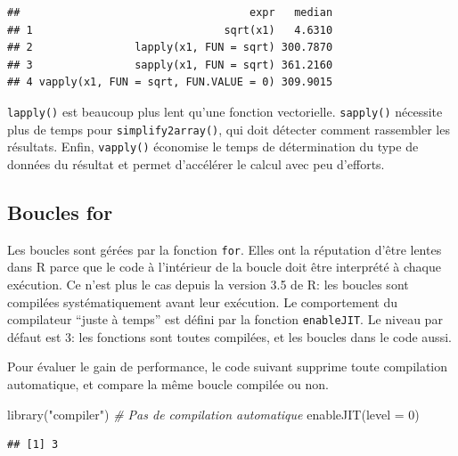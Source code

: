 \documentclass[
  11pt,
  french,
  a4paper,
  extrafontsizes,onecolumn,openright
  ]{memoir}
\newenvironment{Shaded}{\begin{snugshade}}{\end{snugshade}}
\newcommand{\AttributeTok}[1]{\textcolor[rgb]{0.77,0.63,0.00}{#1}}
\newcommand{\CommentTok}[1]{\textcolor[rgb]{0.56,0.35,0.01}{\textit{#1}}}
\newcommand{\DecValTok}[1]{\textcolor[rgb]{0.00,0.00,0.81}{#1}}
\newcommand{\FunctionTok}[1]{\textcolor[rgb]{0.00,0.00,0.00}{#1}}
\newcommand{\NormalTok}[1]{#1}
\newcommand{\StringTok}[1]{\textcolor[rgb]{0.31,0.60,0.02}{#1}}
\begin{document}
\begin{verbatim}
##                                    expr   median
## 1                              sqrt(x1)   4.6310
## 2                lapply(x1, FUN = sqrt) 300.7870
## 3                sapply(x1, FUN = sqrt) 361.2160
## 4 vapply(x1, FUN = sqrt, FUN.VALUE = 0) 309.9015
\end{verbatim}

\normalsize
\texttt{lapply()} est beaucoup plus lent qu'une fonction vectorielle.
\texttt{sapply()} nécessite plus de temps pour \texttt{simplify2array()}, qui doit détecter comment rassembler les résultats.
Enfin, \texttt{vapply()} économise le temps de détermination du type de données du résultat et permet d'accélérer le calcul avec peu d'efforts.

\hypertarget{boucles-for}{%
\subsection{Boucles for}\label{boucles-for}}

Les boucles sont gérées par la fonction \texttt{for}.
Elles ont la réputation d'être lentes dans R parce que le code à l'intérieur de la boucle doit être interprété à chaque exécution.
Ce n'est plus le cas depuis la version 3.5 de R: les boucles sont compilées systématiquement avant leur exécution.
Le comportement du compilateur ``juste à temps'' est défini par la fonction \texttt{enableJIT}.
Le niveau par défaut est 3: les fonctions sont toutes compilées, et les boucles dans le code aussi.

Pour évaluer le gain de performance, le code suivant supprime toute compilation automatique, et compare la même boucle compilée ou non.

\scriptsize

\begin{Shaded}
\begin{Highlighting}[]
\FunctionTok{library}\NormalTok{(}\StringTok{"compiler"}\NormalTok{)}
\CommentTok{\# Pas de compilation automatique}
\FunctionTok{enableJIT}\NormalTok{(}\AttributeTok{level =} \DecValTok{0}\NormalTok{)}
\end{Highlighting}
\end{Shaded}

\begin{verbatim}
## [1] 3
\end{verbatim}
\end{document}
